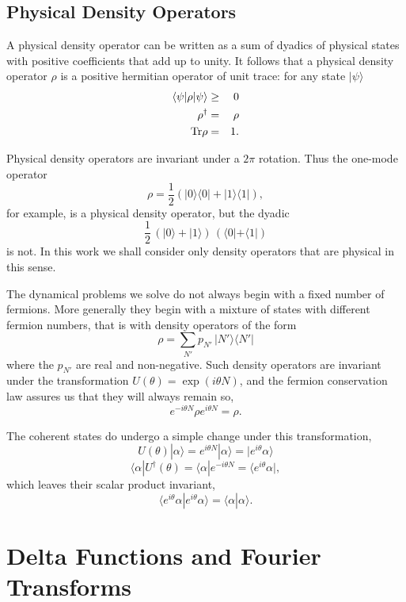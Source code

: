 \documentclass[12pt]{article}
\def\beq{\begin{equation}}
\def\eeq{\end{equation}}
\def\bea{\begin{eqnarray}}
\def\eea{\end{eqnarray}}
\def\a{\alpha}
\def\th{\theta}
\def\dgr{\dagger}
\def\Tr{{\rm Tr}}
\def\half{\frac{1}{2}}
\begin{document}
\subsection{Physical Density Operators} 
A physical density operator can be written
as a sum of dyadics of physical states 
with positive coefficients that add up to unity.
It follows that a physical density operator $ \rho $
is a positive hermitian operator of unit trace:
for any state $ | \psi \rangle $ 
\bea
\langle \psi | \rho | \psi \rangle & \ge & 0 \\
\rho ^\dgr & = & \rho \\
\Tr \rho & = & 1 .
\label {rho}
\eea
\par
Physical density operators are invariant under a $ 2 \pi $ rotation.
Thus the one-mode operator 
\beq
\rho = \half \left( | 0 \rangle \langle 0 |
+ | 1 \rangle \langle 1 | \right) ,
\label {pdo1}
\eeq
for example,
is a physical density operator,
but the dyadic
\beq
\half \, \left( | 0 \rangle + | 1 \rangle \right)
\, \left(  \langle 0 | + \langle 1 | \right)
\label {sdo1}
\eeq
is not. 
In this work we shall consider only
density operators that are physical in this sense.
\par
The dynamical problems we solve do not always
begin with a fixed number of fermions.
More generally they begin with a mixture of states
with different fermion numbers, that is
with density operators of the form
\beq
\rho = \sum_ { N' } p_ { N' } \, | N' \rangle \langle N' | 
\label {rhoN'}
\eeq
where the $ p_ { N' } $ are real and non-negative.
Such density operators are invariant under
the transformation $ U( \th ) = \exp ( i \th N ) $,
and the fermion conservation law assures us that 
they will always remain so,
\beq
e ^ { - i \th N } \rho e ^ { i \th N } = \rho .
\label {UrUd}
\eeq
\par
The coherent states do undergo a simple
change under this transformation,
\beq
U( \th ) | \a \rangle = e ^ { i \th N } | \a \rangle 
= | e ^ { i \th } \a \rangle 
\label {ath}
\eeq
\beq
\langle \a | U^\dgr( \th ) = \langle \a | e ^ { - i \th N } 
= \langle e ^ { i \th } \a | ,
\label {adth}
\eeq
which leaves their scalar product invariant,
\beq
\langle e ^ { i \th } \a | e ^ { i \th } \a \rangle 
= \langle \a | \a \rangle .
\label {spinv}
\eeq



\section{Delta Functions and Fourier Transforms}
\end{document}
